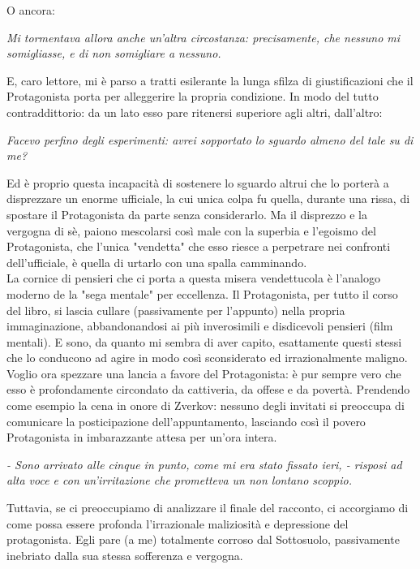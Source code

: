 \documentclass[12pt,a4paper]{report}
\theoremstyle{definition}
\theoremstyle{Theorem}
\theoremstyle{definition}
\theoremstyle{definition}
\theoremstyle{definition}
\begin{document}
 O ancora: 
 \begin{center}
 	\textit{Mi tormentava allora anche un'altra circostanza: precisamente, che nessuno mi somigliasse, e di non somigliare a nessuno.}
 \end{center}
E, caro lettore, mi è parso a tratti esilerante la lunga sfilza di giustificazioni che il Protagonista porta per alleggerire la propria condizione. In modo del tutto contraddittorio: da un lato esso pare ritenersi superiore agli altri, dall'altro:
\begin{center}
	\textit{Facevo perfino degli esperimenti: avrei sopportato lo sguardo almeno del tale su di me?}
\end{center}
Ed è proprio questa incapacità di sostenere lo sguardo altrui che lo porterà a disprezzare un enorme ufficiale, la cui unica colpa fu quella, durante una rissa, di spostare il Protagonista da parte senza considerarlo. Ma il disprezzo e la vergogna di sè, paiono mescolarsi così male con la superbia e l'egoismo del Protagonista, che l'unica "vendetta" che esso riesce a perpetrare nei confronti dell'ufficiale, è quella di urtarlo con una spalla camminando.\\
La cornice di pensieri che ci porta a questa misera vendettucola è l'analogo moderno de la "sega mentale" per eccellenza. Il Protagonista, per tutto il corso del libro, si lascia cullare (passivamente per l'appunto) nella propria immaginazione, abbandonandosi ai più inverosimili e disdicevoli pensieri (film mentali). E sono, da quanto mi sembra di aver capito, esattamente questi stessi che lo conducono ad agire in modo così sconsiderato ed irrazionalmente maligno.\\
Voglio ora spezzare una lancia a favore del Protagonista: è pur sempre vero che esso è profondamente circondato da cattiveria, da offese e da povertà. Prendendo come esempio la cena in onore di Zverkov: nessuno degli invitati si preoccupa di comunicare la posticipazione dell'appuntamento, lasciando così il povero Protagonista in imbarazzante attesa per un'ora intera.
\begin{center}
	\textit{- Sono arrivato alle cinque in punto, come mi era stato fissato ieri, - risposi ad alta voce e con un'irritazione che prometteva un non lontano scoppio.}
\end{center}
Tuttavia, se ci preoccupiamo di analizzare il finale del racconto, ci accorgiamo di come possa essere profonda l'irrazionale maliziosità e depressione del protagonista. Egli pare (a me) totalmente corroso dal Sottosuolo, passivamente inebriato dalla sua stessa sofferenza e vergogna.\\
\end{document}
